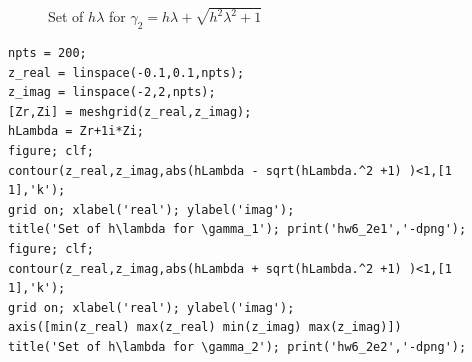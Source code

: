 \documentclass[14pt,a4paper]{article}
\begin{document}
\begin{enumerate}
\begin{figure}[htp]
		\caption{Set of $h\lambda$ for $\gamma_2 = h\lambda + \sqrt{h^2\lambda^2 +1}$}
	\end{figure}
	\begin{lstlisting}
npts = 200;                        
z_real = linspace(-0.1,0.1,npts);   
z_imag = linspace(-2,2,npts);     
[Zr,Zi] = meshgrid(z_real,z_imag); 
hLambda = Zr+1i*Zi;                
figure; clf; 
contour(z_real,z_imag,abs(hLambda - sqrt(hLambda.^2 +1) )<1,[1 1],'k');
grid on; xlabel('real'); ylabel('imag');
title('Set of h\lambda for \gamma_1'); print('hw6_2e1','-dpng');
figure; clf; 
contour(z_real,z_imag,abs(hLambda + sqrt(hLambda.^2 +1) )<1,[1 1],'k');
grid on; xlabel('real'); ylabel('imag');
axis([min(z_real) max(z_real) min(z_imag) max(z_imag)])
title('Set of h\lambda for \gamma_2'); print('hw6_2e2','-dpng');
	\end{lstlisting}
\end{enumerate}
\end{document}
